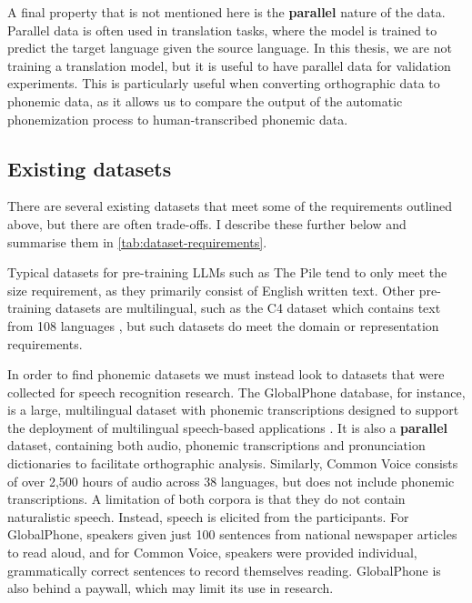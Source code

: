 A final property that is not mentioned here is the \textbf{parallel} nature of the data. Parallel data is often used in translation tasks, where the model is trained to predict the target language given the source language. In this thesis, we are not training a translation model, but it is useful to have parallel data for validation experiments. This is particularly useful when converting orthographic data to phonemic data, as it allows us to compare the output of the automatic phonemization process to human-transcribed phonemic data.

\subsection{Existing datasets}
\label{sec:dataset-existing}

There are several existing datasets that meet some of the requirements outlined above, but there are often trade-offs. I describe these further below and summarise them in \cref{tab:dataset-requirements}.

Typical datasets for pre-training LLMs such as The Pile tend to only meet the size requirement, as they primarily consist of English written text. Other pre-training datasets are multilingual, such as the C4 dataset which contains text from 108 languages \citep{raffel2020exploring}, but such datasets do meet the domain or representation requirements.

In order to find phonemic datasets we must instead look to datasets that were collected for speech recognition research. The GlobalPhone database, for instance, is a large, multilingual dataset with phonemic transcriptions designed to support the deployment of multilingual speech-based applications \citep{schultz2013globalphone}. It is also a \textbf{parallel} dataset, containing both audio, phonemic transcriptions and pronunciation dictionaries to facilitate orthographic analysis. Similarly, Common Voice \citep{ardila-etal-2020-common} consists of over 2,500 hours of audio across 38 languages, but does not include phonemic transcriptions. A limitation of both corpora is that they do not contain naturalistic speech. Instead, speech is elicited from the participants. For GlobalPhone, speakers given just 100 sentences from national newspaper articles to read aloud, and for Common Voice, speakers were provided individual, grammatically correct sentences to record themselves reading. GlobalPhone is also behind a paywall, which may limit its use in research. 

